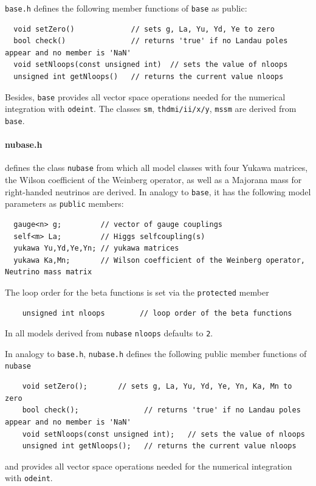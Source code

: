 \documentclass[11pt,a4paper]{article}
\begin{document}
\texttt{base.h} defines the following member functions of \texttt{base} as public:
\begin{lstlisting}
  void setZero()             // sets g, La, Yu, Yd, Ye to zero
  bool check()               // returns 'true' if no Landau poles appear and no member is 'NaN'
  void setNloops(const unsigned int)  // sets the value of nloops
  unsigned int getNloops()   // returns the current value nloops
\end{lstlisting}
Besides, \texttt{base} provides all vector space operations needed for the numerical integration with \texttt{odeint}. The classes \texttt{sm}, \texttt{thdmi/ii/x/y}, \texttt{mssm} are derived from \texttt{base}.

\paragraph{nubase.h}
defines the class \texttt{nubase} from which all model classes with four Yukawa matrices, the Wilson coefficient of the Weinberg operator, as well as a Majorana mass for right-handed neutrinos are derived.
In analogy to \texttt{base}, it has the following model parameters as \texttt{public} members:
\begin{lstlisting}
  gauge<n> g;         // vector of gauge couplings
  self<m> La;         // Higgs selfcoupling(s)
  yukawa Yu,Yd,Ye,Yn; // yukawa matrices
  yukawa Ka,Mn;       // Wilson coefficient of the Weinberg operator, Neutrino mass matrix   
\end{lstlisting}
The loop order for the beta functions is set via the \texttt{protected} member
\begin{lstlisting}
    unsigned int nloops        // loop order of the beta functions
\end{lstlisting}
In all models derived from \texttt{nubase} \texttt{nloops} defaults to \texttt{2}.

In analogy to \texttt{base.h}, \texttt{nubase.h} defines the following public member functions of \texttt{nubase}
\begin{lstlisting}
    void setZero();       // sets g, La, Yu, Yd, Ye, Yn, Ka, Mn to zero
    bool check();               // returns 'true' if no Landau poles appear and no member is 'NaN'
    void setNloops(const unsigned int);   // sets the value of nloops
    unsigned int getNloops();   // returns the current value nloops
\end{lstlisting}
and provides all vector space operations needed for the numerical integration with \texttt{odeint}.
\end{document}
